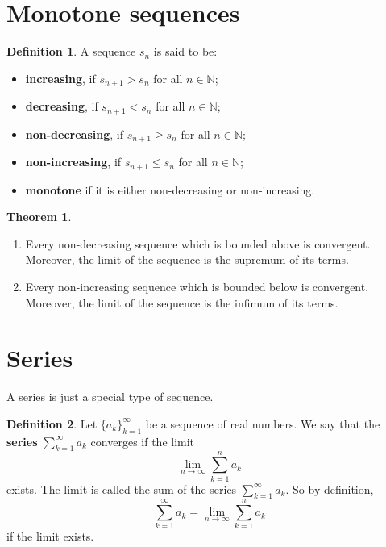 \documentclass[12pt, a4paper]{article}
\newcommand{\bb}[1]{\mathbb{#1}}
\theoremstyle{definition}
\newtheorem{definition}{Definition}[section]
\newtheorem{theorem}{Theorem}[section]
\theoremstyle{plain}
\begin{document}
\section{Monotone sequences}

\begin{definition}
A sequence $s_n$ is said to be:
\begin{itemize}

	\item \textbf{increasing}, if $s_{n+1} > s_n$ for all $n \in \bb{N}$;

	\item \textbf{decreasing}, if $s_{n+1} < s_n$ for all $n \in \bb{N}$;

	\item \textbf{non-decreasing}, if $s_{n+1} \geq s_n$ for all $n \in \bb{N}$;

	\item \textbf{non-increasing}, if $s_{n+1} \leq s_n$ for all $n \in \bb{N}$;

	\item \textbf{monotone} if it is either non-decreasing or non-increasing.

\end{itemize}
\end{definition}

\begin{theorem} \hphantom{This is to make space for formatting}
\begin{enumerate}
	
	\item Every non-decreasing sequence which is bounded above is convergent. Moreover, the limit of the sequence is the supremum of its terms.

	\item Every non-increasing sequence which is bounded below is convergent. Moreover, the limit of the sequence is the infimum of its terms.

\end{enumerate}
\end{theorem}

\section{Series}

A series is just a special type of sequence.

\begin{definition}
Let $\{a_k\}_{k=1}^{\infty}$ be a sequence of real numbers. We say that the \textbf{series} $\sum_{k=1}^{\infty} a_k$ converges if the limit $$\lim_{n\to \infty} \sum_{k=1}^{n} a_k$$ exists. The limit is called the sum of the series $\sum_{k=1}^{\infty} a_k.$ So by definition, $$\sum_{k=1}^{\infty} a_k =\lim_{n\to\infty} \sum_{k=1}^{n} a_k$$ if the limit exists.
\end{definition}
\end{document}
